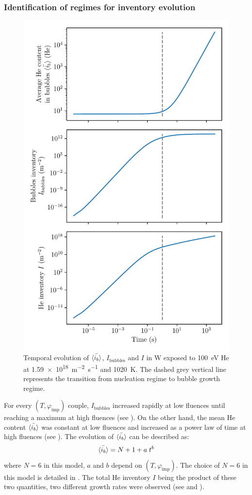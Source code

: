 \subsubsection{Identification of regimes for inventory evolution} 

\begin{figure} [h]
    \centering
    \includegraphics[width=0.75\linewidth]{Figures/Chapter4/parametric study/inventory_bubbles_ib.pdf}
    \caption{Temporal evolution of $\Bar{\langle i_b \rangle}$, $I_\mathrm{bubbles}$ and $I$ in W exposed to \SI{100}{eV} He at \SI{1.59e18}{m^{-2}.s^{-1}} and \SI{1020}{K}. The dashed grey vertical line represents the transition from nucleation regime to bubble growth regime.}
\end{figure}

For every $(T, \varphi_\mathrm{imp})$ couple, $I_\mathrm{bubbles}$ increased rapidly at low \glspl{fluence} until reaching a maximum at high \glspl{fluence} (see ).
On the other hand, the mean \gls{He} content $\Bar{\langle i_b \rangle}$ was constant at low \glspl{fluence} and increased as a power law of time at high \glspl{fluence} (see ).
The evolution of $\Bar{\langle i_b \rangle}$ can be described as:
\begin{equation}
    \Bar{\langle i_b \rangle} = N + 1 + a \; t^b
    \labeq{ib evolution}
\end{equation}
where $N=6$ in this model, $a$ and $b$ depend on $(T, \varphi_\mathrm{imp})$.
The choice of $N=6$ in this model is detailed in .
The total \gls{He} \gls{inventory} $I$ being the product of these two quantities, two different growth rates were observed (see  and ).

